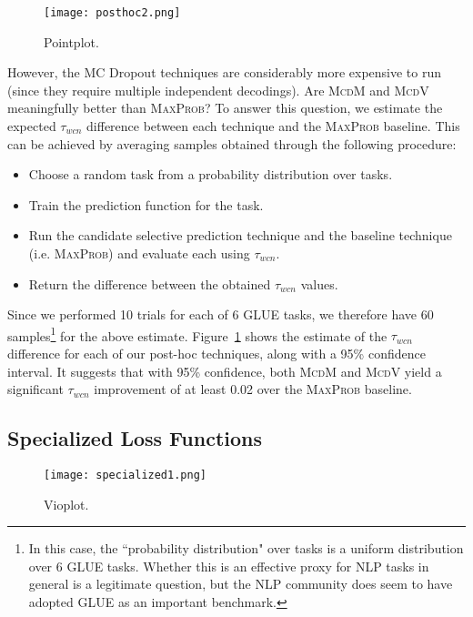 \documentclass[11pt]{article}
\begin{document}
\begin{figure}
\centering
\texttt{[image: posthoc2.png]}
\caption{Pointplot.}
\label{fig:posthocpointplot}
\end{figure}


However, the MC Dropout techniques are considerably more expensive to run (since they require multiple independent decodings). Are \textsc{McdM} and \textsc{McdV} meaningfully better than \textsc{MaxProb}? To answer this question, we estimate the expected $\tau_{wcn}$ difference between each technique and the \textsc{MaxProb} baseline. This can be achieved by averaging samples obtained through the following procedure:
\begin{itemize}
\item Choose a random task from a probability distribution over tasks.
\item Train the prediction function for the task.	
\item Run the candidate selective prediction technique and the baseline technique (i.e. \textsc{MaxProb}) and evaluate each using $\tau_{wcn}$.
\item Return the difference between the obtained $\tau_{wcn}$ values.
\end{itemize}

\noindent Since we performed 10 trials for each of 6 GLUE tasks, we therefore have 60 samples\footnote{In this case, the ``probability distribution" over tasks is a uniform distribution over 6 GLUE tasks. Whether this is an effective proxy for NLP tasks in general is a legitimate question, but the NLP community does seem to have adopted GLUE as an important benchmark.} for the above estimate. Figure~\ref{fig:posthocpointplot} shows the estimate of the $\tau_{wcn}$ difference for each of our post-hoc techniques, along with a 95\% confidence interval. It suggests that with 95\% confidence, both \textsc{McdM} and \textsc{McdV} yield a significant $\tau_{wcn}$ improvement of at least 0.02 over the \textsc{MaxProb} baseline. 

\subsection{Specialized Loss Functions}


\begin{figure}
\centering
\texttt{[image: specialized1.png]}
\caption{Vioplot.}
\label{fig:specializedviolin}
\end{figure}
\end{document}
